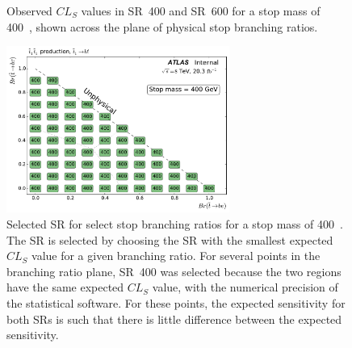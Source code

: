 \begin{figure}[ht]
  \centering
  \caption{
    Observed $CL_S$ values in SR~400 and SR~600 for a stop mass of 400~\GeV,
    shown across the plane of physical stop branching ratios.
  }
\end{figure}

\begin{figure}[ht]
  \centering
  \includegraphics[width=0.65\textwidth]
    {figs/blstop/region_selection/region_choice_vs_br_m_400.pdf}
  \caption{
    Selected SR for select stop branching ratios for a stop mass of 400~\GeV.
    The SR is selected by choosing the SR with the smallest expected $CL_S$
    value for a given branching ratio.
    For several points in the branching ratio plane, SR~400 was selected because
    the two regions have the same expected $CL_S$ value, with the numerical
    precision of the statistical software.
    For these points, the expected sensitivity for both SRs is such that
    there is little difference between the expected sensitivity.
  }
\end{figure}

